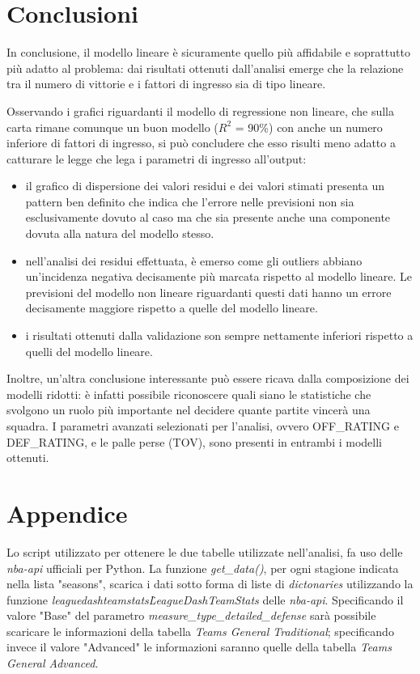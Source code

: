 \documentclass[11pt,a4paper]{article}
\begin{document}
\section{Conclusioni}
In conclusione, il modello lineare è sicuramente quello più affidabile e soprattutto più adatto al problema: dai risultati ottenuti dall'analisi emerge che la relazione tra il numero di vittorie e i fattori di ingresso sia di tipo lineare. 

Osservando i grafici riguardanti il modello di regressione non lineare, che sulla carta rimane comunque un buon modello ($R^2$ = 90\%) con anche un numero inferiore di fattori di ingresso, si può concludere che esso risulti meno adatto a catturare le legge che lega i parametri di ingresso all'output:

\begin{itemize}
    \item il grafico di dispersione dei valori residui e dei valori stimati presenta un pattern ben definito che indica che l'errore nelle previsioni non sia esclusivamente dovuto al caso ma che sia presente anche una componente dovuta alla natura del modello stesso.
    \item nell'analisi dei residui effettuata, è emerso come gli outliers abbiano un'incidenza negativa decisamente più marcata rispetto al modello lineare. 
    Le previsioni del modello non lineare riguardanti questi dati hanno un errore decisamente maggiore rispetto a quelle del modello lineare.
    \item i risultati ottenuti dalla validazione son sempre nettamente inferiori rispetto a quelli del modello lineare.
\end{itemize}

Inoltre, un'altra conclusione interessante può essere ricava dalla composizione dei modelli ridotti: è infatti possibile riconoscere quali siano le statistiche che svolgono un ruolo più importante nel decidere quante partite vincerà una squadra. I parametri avanzati selezionati per l'analisi, ovvero OFF\_RATING e DEF\_RATING, e le palle perse (TOV), sono presenti in entrambi i modelli ottenuti.

\newpage
\appendix
\section{Appendice}
 Lo script utilizzato per ottenere le due tabelle utilizzate nell'analisi, fa uso delle \emph{nba-api} ufficiali per Python.
 La funzione \emph{get\_data()}, per ogni stagione indicata nella lista "seasons", scarica i dati sotto forma di liste di \emph{dictonaries} utilizzando la funzione \emph{leaguedashteamstats\.LeagueDashTeamStats} delle \emph{nba-api}. Specificando il valore "Base" del parametro \emph{measure\_type\_detailed\_defense} sarà possibile scaricare le informazioni della tabella \emph{Teams General Traditional}; specificando invece il valore "Advanced" le informazioni saranno quelle della tabella \emph{Teams General Advanced}.
 
\end{document}
